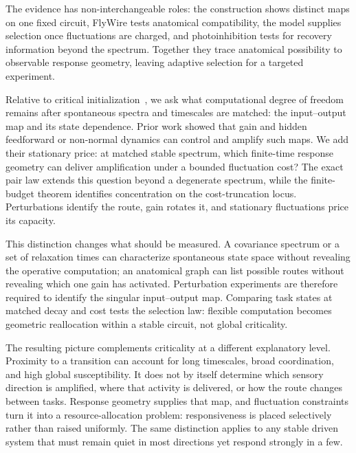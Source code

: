 \documentclass[
  aps,prl,reprint,superscriptaddress,nofootinbib,longbibliography,floatfix,
  amsmath,amssymb
]{revtex4-2}
\begin{document}
The evidence has non-interchangeable roles: the construction shows distinct
maps on one fixed circuit, FlyWire tests anatomical compatibility, the model
supplies selection once fluctuations are charged, and photoinhibition tests for
recovery information beyond the spectrum.  Together they trace anatomical
possibility to observable response geometry, leaving adaptive selection for a
targeted experiment.

Relative to critical initialization~\cite{pachitariu2026critical}, we ask what
computational degree of freedom remains after spontaneous spectra and timescales
are matched: the input--output map and its state dependence.  Prior work showed
that gain and hidden feedforward or non-normal dynamics can control and amplify
such maps.  We add their stationary price: at matched stable spectrum, which
finite-time response geometry can deliver amplification under a bounded
fluctuation cost?  The exact pair law extends this question beyond a degenerate
spectrum, while the finite-budget theorem identifies concentration on the
cost-truncation locus.  Perturbations identify the route, gain rotates it, and
stationary fluctuations price its capacity.

This distinction changes what should be measured.  A covariance spectrum or a
set of relaxation times can characterize spontaneous state space without
revealing the operative computation; an anatomical graph can list possible
routes without revealing which one gain has activated.  Perturbation experiments
are therefore required to identify the singular input--output map.  Comparing
task states at matched decay and cost tests the selection law: flexible
computation becomes geometric reallocation within a stable circuit, not global
criticality.

The resulting picture complements criticality at a different explanatory
level.  Proximity to a transition can account for long timescales, broad
coordination, and high global susceptibility.  It does not by itself determine
which sensory direction is amplified, where that activity is delivered, or
how the route changes between tasks.  Response geometry supplies that map, and
fluctuation constraints turn it into a resource-allocation problem:
responsiveness is placed selectively rather than raised uniformly.  The same
distinction applies to any stable driven system that must remain quiet in most
directions yet respond strongly in a few.
\end{document}
